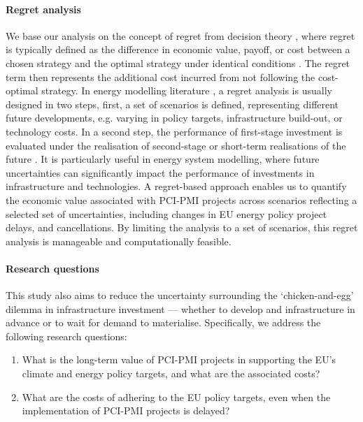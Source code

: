 \documentclass[preprint,12pt,sort&compress]{elsarticle}
\begin{document}
\paragraph{Regret analysis}
We base our analysis on the concept of regret from decision theory \cite{loomesRegretTheoryAlternative1982}, where regret is typically defined as the difference in economic value, payoff, or cost between a chosen strategy and the optimal strategy under identical conditions \cite{mobiusRegretAnalysisInvestment2020}. The regret term then represents the additional cost incurred from not following the cost-optimal strategy. In energy modelling literature \cite{vanderweijdeEconomicsPlanningElectricity2012,mobiusRegretAnalysisInvestment2020}, a regret analysis is usually designed in two steps, first, a set of scenarios is defined, representing different future developments, e.g. varying in policy targets, infrastructure build-out, or technology costs. In a second step, the performance of first-stage investment is evaluated under the realisation of second-stage or short-term realisations of the future \cite{salvatoreManagerialEconomicPrinciples2008}. It is particularly useful in energy system modelling, where future uncertainties can significantly impact the performance of investments in infrastructure and technologies.
A regret-based approach enables us to quantify the economic value associated with PCI-PMI projects across scenarios reflecting a selected set of uncertainties, including changes in EU energy policy project delays, and cancellations. By limiting the analysis to a set of scenarios, this regret analysis is manageable and computationally feasible.

\paragraph{Research questions}
This study also aims to reduce the uncertainty surrounding the `chicken-and-egg' dilemma in infrastructure investment --- whether to develop  and  infrastructure in advance or to wait for demand to materialise. Specifically, we address the following research questions:
\begin{enumerate} 
  \item What is the long-term value of PCI-PMI projects in supporting the EU’s climate and energy policy targets, and what are the associated costs?
  \item What are the costs of adhering to the EU policy targets, even when the implementation of PCI-PMI projects is delayed?
\end{enumerate}
\end{document}
